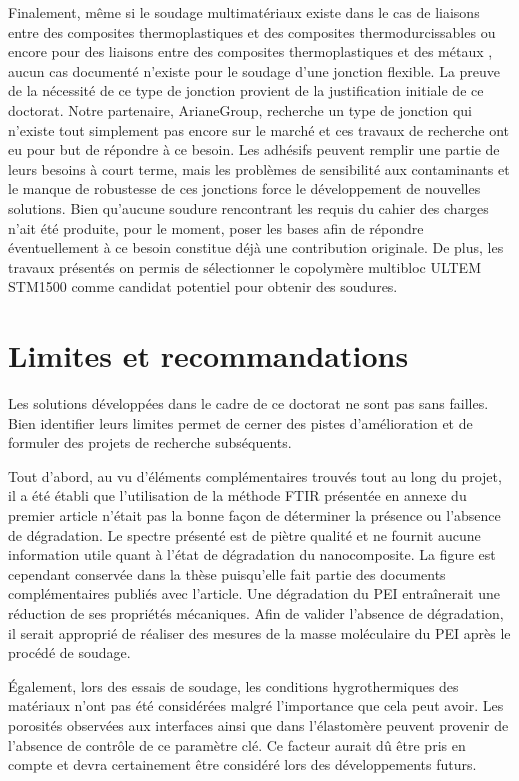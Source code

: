 Finalement, même si le soudage multimatériaux existe dans le cas de liaisons entre des composites thermoplastiques et des composites thermodurcissables \cite{FernandezVillegas2015,Lionetto2018a} ou encore pour des liaisons entre des composites thermoplastiques et des métaux \cite{Weidmann2018,Kruger2004,Balle2009,Goushegir2016}, aucun cas documenté n'existe pour le soudage d'une jonction flexible. 
La preuve de la nécessité de ce type de jonction provient de la justification initiale de ce doctorat.
Notre partenaire, ArianeGroup, recherche un type de jonction qui n'existe tout simplement pas encore sur le marché et ces travaux de recherche ont eu pour but de répondre à ce besoin. 
Les adhésifs peuvent remplir une partie de leurs besoins à court terme, mais les problèmes de sensibilité aux contaminants et le manque de robustesse de ces jonctions force le développement de nouvelles solutions. 
Bien qu'aucune soudure rencontrant les requis du cahier des charges n'ait été produite, pour le moment, poser les bases afin de répondre éventuellement à ce besoin constitue déjà une contribution originale. 
De plus, les travaux présentés on permis de sélectionner le copolymère multibloc ULTEM STM1500 comme candidat potentiel pour obtenir des soudures. 

\section{Limites et recommandations}

Les solutions développées dans le cadre de ce doctorat ne sont pas sans failles. 
Bien identifier leurs limites permet de cerner des pistes d'amélioration et de formuler des projets de recherche subséquents. 

Tout d'abord, au vu d'éléments complémentaires trouvés tout au long du projet, il a été établi que l'utilisation de la méthode FTIR présentée en annexe du premier article n'était pas la bonne façon de déterminer la présence ou l'absence de dégradation. 
Le spectre présenté est de piètre qualité et ne fournit aucune information utile quant à l'état de dégradation du nanocomposite. 
La figure est cependant conservée dans la thèse puisqu'elle fait partie des documents complémentaires publiés avec l'article. 
Une dégradation du PEI entraînerait une réduction de ses propriétés mécaniques. 
Afin de valider l'absence de dégradation, il serait approprié de réaliser des mesures de la masse moléculaire du PEI après le procédé de soudage. 

Également, lors des essais de soudage, les conditions hygrothermiques des matériaux n'ont pas été considérées malgré l'importance que cela peut avoir. 
Les porosités observées aux interfaces ainsi que dans l'élastomère peuvent provenir de l'absence de contrôle de ce paramètre clé. 
Ce facteur aurait dû être pris en compte et devra certainement être considéré lors des développements futurs. 

